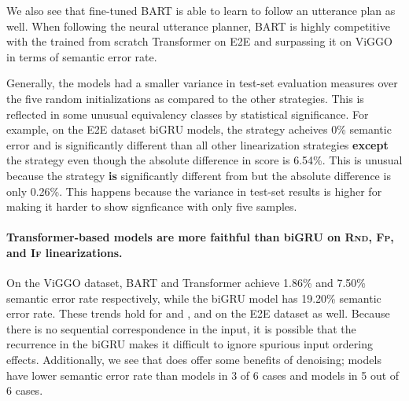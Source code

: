 We also see that fine-tuned BART is able to learn to follow an utterance plan
as well. When following the neural utterance planner,
BART is highly competitive with the trained from scratch Transformer
on E2E and surpassing it on ViGGO in terms of semantic error rate.







    Generally, the  models had a smaller variance in test-set
evaluation measures over the five random initializations as compared to the
other strategies. This is reflected in some unusual equivalency classes
by statistical significance. For example, on the E2E dataset biGRU models,
the  strategy acheives 0\% semantic error and is significantly
different than all other linearization strategies \textbf{except} 
the  strategy even though the absolute difference in score is 
6.54\%. This is unusual because the  strategy \textbf{is} 
significantly different from  but the absolute difference is
only 0.26\%. This happens because the variance in test-set results
is higher for  making it harder to show signficance with only
five samples.









\paragraph{Transformer-based models are more faithful than biGRU on
\textsc{Rnd, Fp}, and \textsc{If} linearizations.} On the ViGGO dataset, BART
and Transformer  achieve 1.86\% and 7.50\% semantic error rate 
respectively, while
the biGRU  model has 19.20\% semantic error rate. These trends hold for 
and , and on the E2E dataset as well. Because there is no
sequential correspondence in the input, it is possible that the recurrence in
the biGRU makes it difficult to ignore spurious input ordering effects.
Additionally, we see that  does offer some benefits of denoising;
 models have lower semantic error rate than  models in 3 of 6 cases 
and  models in 5 out of 6 cases.

